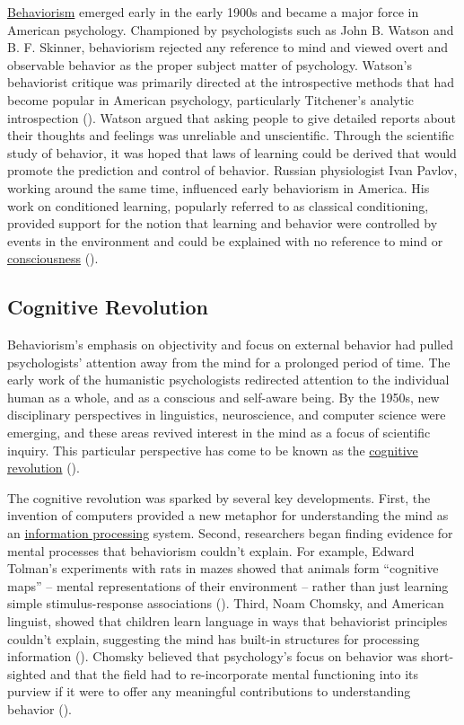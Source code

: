 \documentclass[
]{krantz}
\begin{document}
\hyperref[behaviorism]{Behaviorism} emerged early in the early 1900s and became a major force in American psychology. Championed by psychologists such as John B. Watson and B. F. Skinner, behaviorism rejected any reference to mind and viewed overt and observable behavior as the proper subject matter of psychology. Watson's behaviorist critique was primarily directed at the introspective methods that had become popular in American psychology, particularly Titchener's analytic introspection (). Watson argued that asking people to give detailed reports about their thoughts and feelings was unreliable and unscientific. Through the scientific study of behavior, it was hoped that laws of learning could be derived that would promote the prediction and control of behavior. Russian physiologist Ivan Pavlov, working around the same time, influenced early behaviorism in America. His work on conditioned learning, popularly referred to as classical conditioning, provided support for the notion that learning and behavior were controlled by events in the environment and could be explained with no reference to mind or \hyperref[consciousness]{consciousness} ().

\subsection*{Cognitive Revolution}\label{cognitive-revolution}


Behaviorism's emphasis on objectivity and focus on external behavior had pulled psychologists' attention away from the mind for a prolonged period of time. The early work of the humanistic psychologists redirected attention to the individual human as a whole, and as a conscious and self-aware being. By the 1950s, new disciplinary perspectives in linguistics, neuroscience, and computer science were emerging, and these areas revived interest in the mind as a focus of scientific inquiry. This particular perspective has come to be known as the \hyperref[cognitive-revolution]{cognitive revolution} ().

The cognitive revolution was sparked by several key developments. First, the invention of computers provided a new metaphor for understanding the mind as an \hyperref[information-processing]{information processing} system. Second, researchers began finding evidence for mental processes that behaviorism couldn't explain. For example, Edward Tolman's experiments with rats in mazes showed that animals form ``cognitive maps'' -- mental representations of their environment -- rather than just learning simple stimulus-response associations (). Third, Noam Chomsky, and American linguist, showed that children learn language in ways that behaviorist principles couldn't explain, suggesting the mind has built-in structures for processing information (). Chomsky believed that psychology's focus on behavior was short-sighted and that the field had to re-incorporate mental functioning into its purview if it were to offer any meaningful contributions to understanding behavior ().
\end{document}
